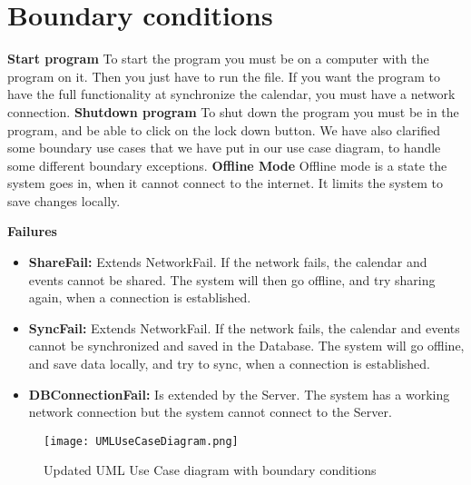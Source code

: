 \section{Boundary conditions}
\textbf{Start program}
To start the program you must be on a computer with the program on it. Then you just have to run the file. If you want the program to have the full functionality at synchronize the calendar, you must have a network connection. 
\newline
\newline
\textbf{Shutdown program}
To shut down the program you must be in the program, and be able to click on the lock down button. 
We have also clarified some boundary use cases that we have put in our use case diagram, to handle some different boundary exceptions. 
\newline
\newline
\textbf{Offline Mode}
Offline mode is a state the system goes in, when it cannot connect to the internet. It limits the system to save changes locally. 

\textbf{Failures}
\begin{itemize}
	\item \textbf{ShareFail:} Extends NetworkFail. If the network fails, the calendar and events cannot be shared. The system will then go offline, and try sharing again, when a connection is established. 
	\item \textbf{SyncFail:} Extends NetworkFail. If the network fails, the calendar and events cannot be synchronized and saved in the Database. The system will go offline, and save data locally, and try to sync, when a connection is established.
	\item \textbf{DBConnectionFail:} Is extended by the Server. The system has a working network connection but the system cannot connect to the Server. 
\end{itemize}


\begin{figure}[h]
\centering
\texttt{[image: UMLUseCaseDiagram.png]}
\caption{Updated UML Use Case diagram with  boundary conditions \label{overflow}}
\label{figur:usecase}
\end{figure}